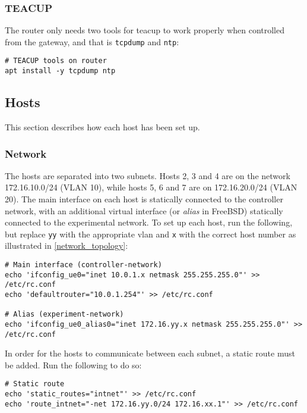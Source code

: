 \subsubsection{TEACUP}

The router only needs two tools for \gls{teacup} to work properly when controlled from the gateway, and that is \lstinline{tcpdump} and \lstinline{ntp}:

\begin{verbatim}
# TEACUP tools on router
apt install -y tcpdump ntp
\end{verbatim}



\subsection{Hosts}

This section describes how each host has been set up.


\subsubsection{Network}

The hosts are separated into two subnets. Hosts 2, 3 and 4 are on the network 172.16.10.0/24 (VLAN 10), while hosts 5, 6 and 7 are on 172.16.20.0/24 (VLAN 20). The main interface on each host is statically connected to the controller network, with an additional virtual interface (or \textit{alias} in FreeBSD) statically connected to the experimental network. To set up each host, run the following, but replace \lstinline{yy} with the appropriate \gls{vlan} and \lstinline{x} with the correct host number as illustrated in \ref{network_topology}:

\begin{verbatim}
# Main interface (controller-network)
echo 'ifconfig_ue0="inet 10.0.1.x netmask 255.255.255.0"' >> /etc/rc.conf
echo 'defaultrouter="10.0.1.254"' >> /etc/rc.conf

# Alias (experiment-network)
echo 'ifconfig_ue0_alias0="inet 172.16.yy.x netmask 255.255.255.0"' >> /etc/rc.conf
\end{verbatim}

In order for the hosts to communicate between each subnet, a static route must be added. Run the following to do so:

\begin{verbatim}
# Static route
echo 'static_routes="intnet"' >> /etc/rc.conf
echo 'route_intnet="-net 172.16.yy.0/24 172.16.xx.1"' >> /etc/rc.conf
\end{verbatim}

